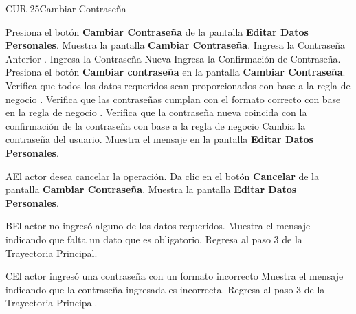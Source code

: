 \begin{UseCase}{CUR 25}{Cambiar Contraseña}
{\begin{UClist}
	    \end{UClist}
	}
 \end{UseCase}

 \begin{UCtrayectoria}
 	
 	\UCpaso [\UCactor] Presiona el botón \textbf{Cambiar Contraseña} de la pantalla \textbf{Editar Datos Personales}.
 	\UCpaso Muestra la pantalla \textbf{Cambiar Contraseña}.
 	\UCpaso [\UCactor] Ingresa la Contraseña Anterior .
 	\UCpaso [\UCactor] Ingresa la Contraseña Nueva 
 	\UCpaso [\UCactor]Ingresa la Confirmación de Contraseña.
 	\UCpaso [\UCactor] Presiona el botón \textbf{Cambiar contraseña} en la pantalla \textbf{Cambiar Contraseña}.
 	\UCpaso Verifica que todos los datos requeridos sean proporcionados con base a la regla de negocio .
 	\UCpaso Verifica que las contraseñas cumplan con el formato correcto con base en la regla de negocio .
 	\UCpaso Verifica que la contraseña nueva coincida con la confirmación de la contraseña con base a la regla de negocio 
 	\UCpaso Cambia la contraseña del usuario.
 	\UCpaso Muestra el mensaje  en la pantalla \textbf{Editar Datos Personales}.
     
 \end{UCtrayectoria}

 \begin{UCtrayectoriaA}{A}{El actor desea cancelar la operación.}
 	\UCpaso [\UCactor] Da clic en el botón \textbf{Cancelar} de la pantalla \textbf{Cambiar Contraseña}.
 	\UCpaso Muestra la pantalla \textbf{Editar Datos Personales}.
    
 \end{UCtrayectoriaA}

 \begin{UCtrayectoriaA}{B}{El actor no ingresó alguno de los datos requeridos.}
	\UCpaso [\UCactor] Muestra el mensaje  indicando que falta un dato que es obligatorio.
	\UCpaso Regresa al paso 3 de la Trayectoria Principal.
	
\end{UCtrayectoriaA} 

\begin{UCtrayectoriaA}{C}{El actor ingresó una contraseña con un formato incorrecto}
	\UCpaso [\UCactor] Muestra el mensaje  indicando que la contraseña ingresada es incorrecta.
	\UCpaso Regresa al paso 3 de la Trayectoria Principal.
	
\end{UCtrayectoriaA} 


